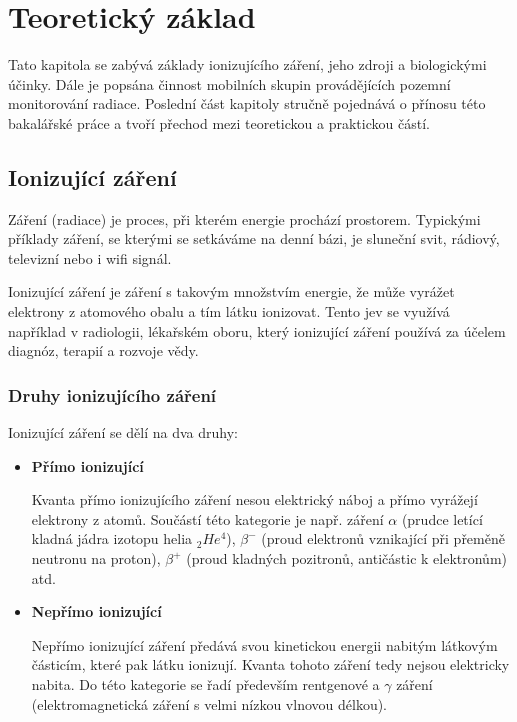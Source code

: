 \chapter{Teoretický základ}
\label{2-teorie}
Tato kapitola se zabývá základy ionizujícího záření, jeho zdroji a biologickými účinky. Dále je popsána činnost mobilních skupin provádějících pozemní monitorování radiace. Poslední část kapitoly stručně pojednává o přínosu této bakalářské práce a tvoří přechod mezi teoretickou a praktickou částí.

\section{Ionizující záření}
	
Záření (radiace) je proces, při kterém energie prochází prostorem. Typickými příklady záření, se kterými se setkáváme na denní bázi, je sluneční svit, rádiový, televizní nebo i wifi signál. 

Ionizující záření je záření s takovým množstvím energie, že může vyrážet elektrony z atomového obalu a tím látku ionizovat. Tento jev se využívá například v radiologii, lékařském oboru, který ionizující záření používá za účelem diagnóz, terapií a rozvoje vědy. \citep{who}

\subsection{Druhy ionizujícího záření} 
Ionizující záření se dělí na dva druhy: \cite{ionZarUllman} \cite{CEZ}

\begin{itemize}
	\item \textbf{Přímo ionizující}
	
		Kvanta přímo ionizujícího záření nesou elektrický náboj a přímo vyrážejí elektrony z atomů. Součástí této kategorie je např. záření $\alpha$ (prudce letící kladná jádra izotopu helia $_{2}He^{4}$), $\beta^{-}$ (proud elektronů vznikající při přeměně neutronu na proton), $\beta^{+}$ (proud kladných pozitronů, antičástic k elektronům) atd.
		 
	\item \textbf{Nepřímo ionizující}
	
		Nepřímo ionizující záření předává svou kinetickou energii nabitým látkovým částicím, které pak látku ionizují. Kvanta tohoto záření tedy nejsou elektricky nabita. Do této kategorie se řadí především rentgenové a $\gamma$ záření (elektromagnetická záření s velmi nízkou vlnovou délkou). 
\end{itemize}

